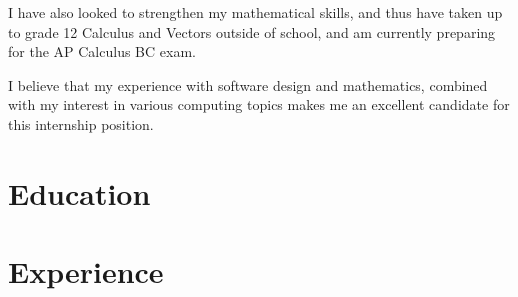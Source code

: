 \documentclass[11pt,a4paper,sans]{moderncv}        %
\begin{document}
I have also looked to strengthen my mathematical skills, and thus have taken up to grade 12 Calculus and Vectors outside of school, and am currently preparing for the AP Calculus BC exam. 

I believe that my experience with software design and mathematics, combined with my interest in various computing topics makes me an excellent candidate for this internship position.

\makeletterclosing

\clearpage


\makecvtitle

\section{Education}


\section{Experience}
\end{document}
